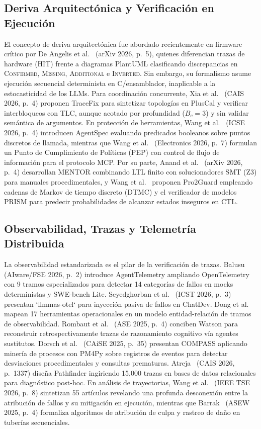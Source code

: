 \documentclass[conference]{IEEEtran}
\begin{document}
\subsection{Deriva Arquitect\'onica y Verificaci\'on en Ejecuci\'on}
El concepto de deriva arquitect\'onica fue abordado recientemente en firmware cr\'itico por De Angelis et al.~\cite{deangelis2026} (arXiv 2026, p.~5), quienes diferencian trazas de hardware (HIT) frente a diagramas PlantUML clasificando discrepancias en \textsc{Confirmed}, \textsc{Missing}, \textsc{Additional} e \textsc{Inverted}. Sin embargo, su formalismo asume ejecuci\'on secuencial determinista en C/ensamblador, inaplicable a la estocasticidad de los LLMs. Para coordinaci\'on concurrente, Xia et al.~\cite{xia2026} (CAIS 2026, p.~4) proponen TraceFix para sintetizar topolog\'ias en PlusCal y verificar interbloqueos con TLC, aunque acotado por profundidad ($B_c=3$) y sin validar sem\'antica de argumentos. En protecci\'on de herramientas, Wang et al.~\cite{wangh2026} (ICSE 2026, p.~4) introducen AgentSpec evaluando predicados booleanos sobre puntos discretos de llamada, mientras que Wang et al.~\cite{wangs2026} (Electronics 2026, p.~7) formulan un Punto de Cumplimiento de Pol\'iticas (PEP) con control de flujo de informaci\'on para el protocolo MCP. Por su parte, Anand et al.~\cite{anand2026} (arXiv 2026, p.~4) desarrollan MENTOR combinando LTL finito con solucionadores SMT (Z3) para manuales procedimentales, y Wang et al.~\cite{wangh2025} proponen Pro2Guard empleando cadenas de Markov de tiempo discreto (DTMC) y el verificador de modelos PRISM para predecir probabilidades de alcanzar estados inseguros en CTL.

\subsection{Observabilidad, Trazas y Telemetr\'ia Distribuida}
La observabilidad estandarizada es el pilar de la verificaci\'on de trazas. Balusu~\cite{balusu2026} (AIware/FSE 2026, p.~2) introduce AgentTelemetry ampliando OpenTelemetry con 9 tramos especializados para detectar 14 categor\'ias de fallos en mocks deterministas y SWE-bench Lite. Seyedghorban et al.~\cite{seyedghorban2026} (ICST 2026, p.~3) presentan `llmmas-otel` para inyecci\'on pasiva de fallos en ChatDev. Dong et al.~\cite{dong2024} mapean 17 herramientas operacionales en un modelo entidad-relaci\'on de tramos de observabilidad. Rombaut et al.~\cite{rombaut2025} (ASE 2025, p.~4) conciben Watson para reconstruir retrospectivamente trazas de razonamiento cognitivo v\'ia agentes sustitutos. Dorsch et al.~\cite{dorsch2025} (CAiSE 2025, p.~35) presentan COMPASS aplicando miner\'ia de procesos con PM4Py sobre registros de eventos para detectar desviaciones procedimentales y consultas prematuras. Atreja~\cite{atreja2026} (CAIS 2026, p.~1337) dise\~na Pathfinder ingiriendo 15,000 trazas en bases de datos relacionales para diagn\'ostico post-hoc. En an\'alisis de trayectorias, Wang et al.~\cite{wangj2026} (IEEE TSE 2026, p.~8) sintetizan 55 art\'iculos revelando una profunda desconexi\'on entre la atribuci\'on de fallos y su mitigaci\'on en ejecuci\'on, mientras que Barrak~\cite{barrak2025} (ASEW 2025, p.~4) formaliza algoritmos de atribuci\'on de culpa y rastreo de da\~no en tuber\'ias secuenciales.
\end{document}
